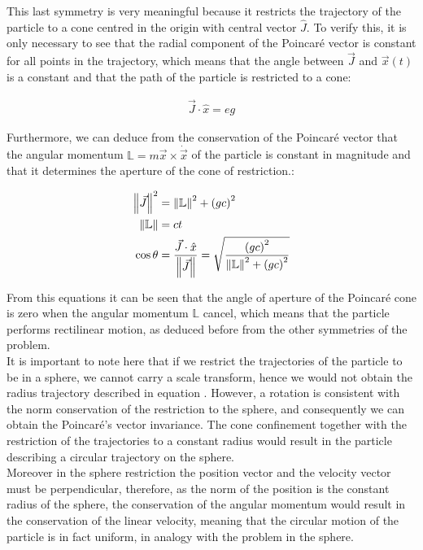 This last symmetry is very meaningful because it restricts the trajectory of the particle to a cone centred in the origin with central vector $\hat{J}$. To verify this, it is only necessary to see that the radial component of the Poincar\'e vector is constant for all points in the trajectory, which means that the angle between $\vec{J}$ and $\vec{x}(t)$ is a constant and that the path of the particle is restricted to a cone:

\begin{align*}
\vec{J}\cdot\hat{x} = eg
\end{align*}

Furthermore, we can deduce from the conservation of the Poincar\'e vector that the angular momentum $\mathbb{L}= m\vec{x}\times\dot{\vec{x}}$ of the particle is constant in magnitude and that it determines the aperture of the cone of restriction.:

\begin{equation}
\begin{aligned}
\left\lVert \vec{J} \right\rVert^2 &= \left\lVert \mathbb{L} \right\rVert^2 +\left( gc \right)^2\\
\left\lVert \mathbb{L} \right\rVert &= ct\\
\cos{\theta} &= \frac{\vec{J}\cdot\hat{x}}{\left\lVert \vec{J} \right\rVert} = \sqrt{\frac{\left( gc \right)^2}{\left\lVert \mathbb{L} \right\rVert^2 +\left( gc \right)^2}}
\end{aligned}
\label{eq:poincarecone}
\end{equation}


From this equations it can be seen that the angle of aperture of the Poincar\'e cone is zero when the angular momentum $\mathbb{L}$ cancel, which means that the particle performs rectilinear motion, as deduced before from the other symmetries of the problem.\\

It is important to note here that if we restrict the trajectories of the particle to be in a sphere, we cannot carry a scale transform, hence we would not obtain the radius trajectory described in equation . However, a rotation is consistent with the norm conservation of the restriction to the sphere, and consequently we can obtain the Poincar\'e's vector invariance. The cone confinement together with the restriction of the trajectories to a constant radius would result in the particle describing a circular trajectory on the sphere.\\ 

Moreover in the sphere restriction the position vector and the velocity vector must be perpendicular, therefore, as the norm of the position is the constant radius of the sphere, the conservation of the angular momentum would result in the conservation of the linear velocity, meaning that the circular motion of the particle is in fact uniform, in analogy with the problem in the sphere.\\

